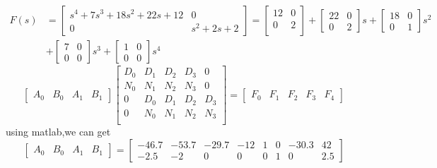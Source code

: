 \documentclass{article}
\begin{document}
\[
\begin{split}F(s)&=
\left[
    \begin{array}{cc}
        s^4+7s^3+18s^2+22s+12 & 0\\
        0 & s^2+2s+2
    \end{array}
\right]=\left[
    \begin{array}{cc}
        12 & 0\\
        0 & 2\\
    \end{array}
\right]+\left[
    \begin{array}{cc}
        22 & 0\\
        0 & 2
    \end{array}
\right]s+\left[
    \begin{array}{cc}
        18 & 0\\
        0 & 1
    \end{array}
\right]s^2 \\
& +\left[
    \begin{array}{cc}
        7 & 0\\
        0 & 0
    \end{array}
\right]s^3+\left[
    \begin{array}{cc}
        1 & 0\\
        0 & 0
    \end{array}
\right]s^4
\end{split}
\]
\[
    \left[ 
        \begin{array}{cccc}
            A_0 & B_0 & A_1 & B_1
        \end{array}
    \right]
    \left[ 
        \begin{array}{ccccc}
            D_0 & D_1 & D_2 & D_3 &0\\
            N_0 & N_1 & N_2 & N_3 & 0\\
            0 & D_0 & D_1 & D_2 & D_3\\
            0 & N_0 & N_1 & N_2 & N_3\\
        \end{array}
    \right]=\left[ 
        \begin{array}{ccccc}
            F_0 & F_1 & F_2 & F_3 & F_4
        \end{array}
    \right]    
\]
using matlab,we can get 
\[
    \left[ 
        \begin{array}{cccc}
            A_0 & B_0 & A_1 & B_1
        \end{array}
    \right]=\left[
        \begin{array}{cccccccc}
            -46.7 & -53.7 & -29.7 & -12 & 1 & 0 & -30.3 & 42\\
            -2.5 & -2 & 0 & 0 & 0 & 1 & 0 & 2.5
        \end{array}
    \right]
\]
\end{document}
